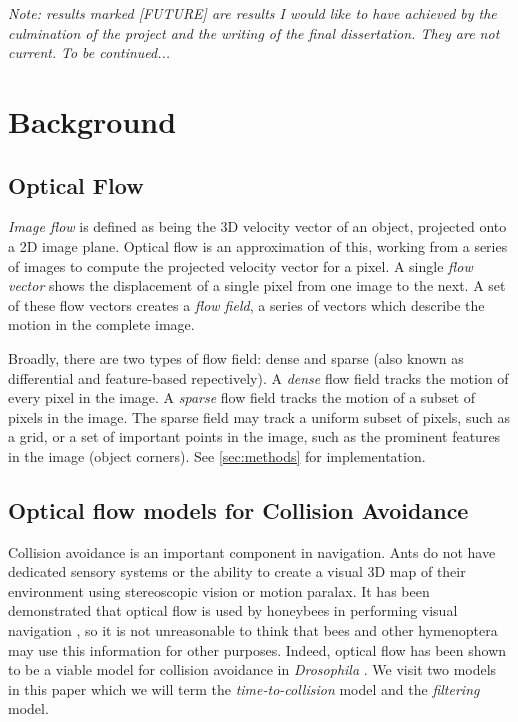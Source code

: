 \documentclass[a4paper,12pt]{article}
\begin{document}
\vfill
\textit{Note: results marked [FUTURE] are results I would like to have achieved by the culmination
of the project and the writing of the final dissertation. They are not current.}
\textit{To be continued...}


\newpage

\section{ Background}
\subsection{ Optical Flow }
\textit{Image flow} is defined as being the 3D velocity vector of an object, projected onto a
2D image plane\cite{ODonovan2005}. Optical flow is an approximation of this, working from a series
of images to compute the projected velocity vector for a pixel. A single \textit{flow vector}
shows the displacement of a single pixel from one image to the next. A set of these flow vectors
creates a \textit{flow field}, a series of vectors which describe the motion in the complete image.
\newline

Broadly, there are two types of flow field: dense and sparse (also known as differential and
feature-based repectively\cite{Low2005}). A \textit{dense} flow field tracks
the motion of every pixel in the image. A \textit{sparse} flow field tracks the motion of a subset
of pixels in the image. The sparse field may track a uniform subset of pixels, such as a grid, or a
set of important points in the image, such as the prominent features in the image (object corners).
See \ref{sec:methods} for implementation.


\subsection{ Optical flow models for Collision Avoidance }
Collision avoidance is an important component in navigation. Ants
do not have dedicated sensory systems or the ability to create a visual 3D map of their environment
using stereoscopic vision or motion paralax. It has been demonstrated that optical flow is used by
honeybees in performing visual navigation \cite{Dittmar2010}, so it is not unreasonable to
think that bees and other hymenoptera may use this information for other purposes. Indeed, optical
flow has been shown to be a viable model for collision avoidance in \textit{Drosophila}
\cite{Stewart2010}. We visit two models in this paper which we will term the
\textit{time-to-collision} model and the \textit{filtering} model.
\end{document}
